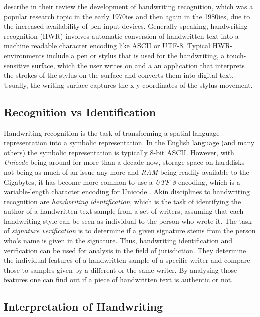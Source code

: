  describe in their review the development of 
handwriting recognition, which was a popular research topic in the early 
1970ies and then again in the 1980ies, due to the increased availability 
of pen-input devices.  Generally speaking, handwriting recognition (HWR) 
involves automatic conversion of handwritten text into a machine readable 
character encoding like ASCII or UTF-8. Typical HWR-environments include 
a pen or stylus that is used for the handwriting, a touch-sensitive surface, 
which the user writes on and a an application that interprets the strokes 
of the stylus on the surface and converts them into digital text. 
Usually, the writing surface captures the x-y coordinates of the stylus 
movement.

\subsection{Recognition vs Identification}
\label{sec:recognitionvsidentification}

Handwriting recognition is the task of transforming a spatial language 
representation into a symbolic representation. In the English language
(and many others) the symbolic representation is typically 8-bit ASCII.
However, with \emph{Unicode} being around for more than a decade now,
storage space on harddisks not being as much of an issue any more and
\emph{RAM} being readily available to the Gigabytes, it has become more 
common to use a \emph{UTF-8}  encoding, which is a variable-length character 
encoding for Unicode .
Akin disciplines to handwriting recognition are 
\emph{handwriting identification}, which is the task of identifying the author
of a handwritten text sample from a set of writers, assuming that each
handwriting style can be seen as individual to the person who wrote it.
The task of \emph{signature verification} is to determine if a given signature
stems from the person who's name is given in the signature.
Thus, handwriting identification and verification can be used for 
analysis in the field of jurisdiction. They determine the individual features
of a handwritten sample of a specific writer and compare those
to samples given by a different or the same writer. By analysing those 
features one can find out if a piece of handwritten text is authentic or not.

\subsection{Interpretation of Handwriting}
\label{sec:interpretationofhandwriting}

